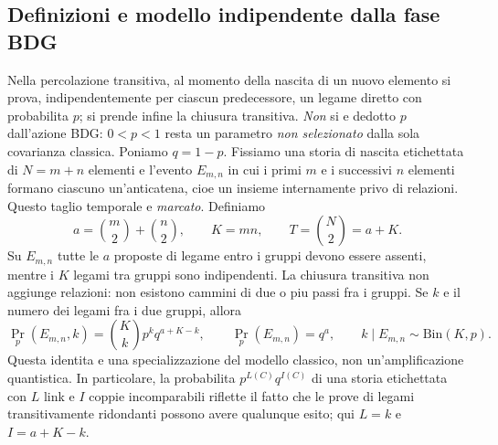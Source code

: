 \documentclass[11pt,a4paper]{article}
\begin{document}
\subsection*{Definizioni e modello indipendente dalla fase BDG}
Nella percolazione transitiva, al momento della nascita di un nuovo elemento si prova, indipendentemente per ciascun predecessore, un legame diretto con probabilita $p$; si prende infine la chiusura transitiva. \emph{Non} si e dedotto $p$ dall'azione BDG: $0<p<1$ resta un parametro \emph{non selezionato} dalla sola covarianza classica. Poniamo $q=1-p$. Fissiamo una storia di nascita etichettata di $N=m+n$ elementi e l'evento $E_{m,n}$ in cui i primi $m$ e i successivi $n$ elementi formano ciascuno un'anticatena, cioe un insieme internamente privo di relazioni. Questo taglio temporale e \emph{marcato}. Definiamo
\begin{equation}
 a=\binom m2+\binom n2,\qquad K=mn,\qquad T=\binom N2=a+K.\tag{CP.1}
\end{equation}
Su $E_{m,n}$ tutte le $a$ proposte di legame entro i gruppi devono essere assenti, mentre i $K$ legami tra gruppi sono indipendenti. La chiusura transitiva non aggiunge relazioni: non esistono cammini di due o piu passi fra i gruppi. Se $k$ e il numero dei legami fra i due gruppi, allora
\begin{equation}
 \boxed{\Pr_p(E_{m,n},k)=\binom Kk p^k q^{a+K-k},\qquad
 \Pr_p(E_{m,n})=q^a,\qquad k\mid E_{m,n}\sim\mathrm{Bin}(K,p).\tag{CP.2}}
 \label{eq:r12bbcp-count}
\end{equation}
Questa identita e una specializzazione del modello classico, non un'amplificazione quantistica. In particolare, la probabilita $p^{L(C)}q^{I(C)}$ di una storia etichettata con $L$ link e $I$ coppie incomparabili riflette il fatto che le prove di legami transitivamente ridondanti possono avere qualunque esito; qui $L=k$ e $I=a+K-k$.
\end{document}
